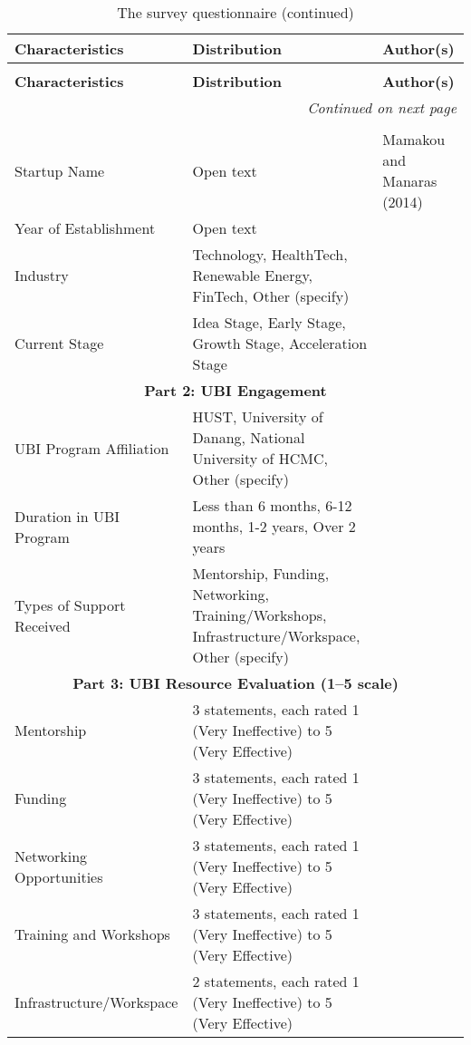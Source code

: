 \documentclass[../Main.tex]{subfiles}%
\begin{document}
	\begin{longtable}{|p{4cm}|p{8cm}|p{3cm}|}
	\caption{The survey questionnaire}\\
	\hline
	\textbf{Characteristics} & \textbf{Distribution} & \textbf{Author(s)} \\
	\hline
	\endfirsthead
	\caption[]{The survey questionnaire (continued)}\\
	\hline
	\textbf{Characteristics} & \textbf{Distribution} & \textbf{Author(s)} \\
	\hline
	\endhead
	\hline
	\multicolumn{3}{r}{\textit{Continued on next page}} \\
	\endfoot
	\hline
	\endlastfoot
	\multicolumn{3}{|c|}{\textbf{Part 1: Startup Information}} \\
	\hline
	Startup Name & Open text & Mamakou and Manaras (2014) \\
	\cline{1-2}
	Year of Establishment & Open text & \\
	\cline{1-2}
	Industry & Technology, HealthTech, Renewable Energy, FinTech, Other (specify) & \\
	\cline{1-2}
	Current Stage & Idea Stage, Early Stage, Growth Stage, Acceleration Stage & \\
	\hline
	\multicolumn{3}{|c|}{\textbf{Part 2: UBI Engagement}} \\
	\hline
	UBI Program Affiliation & HUST, University of Danang, National University of HCMC, Other (specify) & \\
	\cline{1-2}
	Duration in UBI Program & Less than 6 months, 6-12 months, 1-2 years, Over 2 years & \\
	\cline{1-2}
	Types of Support Received & Mentorship, Funding, Networking, Training/Workshops, Infrastructure/Workspace, Other (specify) & \\
	\hline
	\multicolumn{3}{|c|}{\textbf{Part 3: UBI Resource Evaluation (1--5 scale)}} \\
	\hline
	Mentorship & 3 statements, each rated 1 (Very Ineffective) to 5 (Very Effective) & \\
	\cline{1-2}
	Funding & 3 statements, each rated 1 (Very Ineffective) to 5 (Very Effective) & \\
	\cline{1-2}
	Networking Opportunities & 3 statements, each rated 1 (Very Ineffective) to 5 (Very Effective) & \\
	\cline{1-2}
	Training and Workshops & 3 statements, each rated 1 (Very Ineffective) to 5 (Very Effective) & \\
	\cline{1-2}
	Infrastructure/Workspace & 2 statements, each rated 1 (Very Ineffective) to 5 (Very Effective) & \\

\end{longtable}
\end{document}
